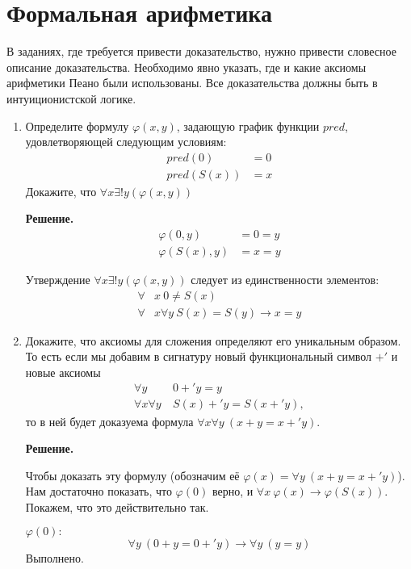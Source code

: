 \section*{Формальная арифметика}

В заданиях, где требуется привести доказательство, нужно привести словесное описание доказательства.
Необходимо явно указать, где и какие аксиомы арифметики Пеано были использованы.
Все доказательства должны быть в интуиционистской логике.
\begin{enumerate}
	
\item Определите формулу $\varphi(x,y)$, задающую график функции $pred$, удовлетворяющей следующим условиям:
\begin{align*}
pred(0) & = 0 \\
pred(S(x)) & = x
\end{align*}
Докажите, что $\forall x \exists! y (\varphi(x,y))$

\textbf{Решение.}
\begin{align*}
	\varphi(0, y) &= 0 = y \\
	\varphi(S(x), y) &= x = y
\end{align*}

Утверждение $\forall x \exists! y (\varphi(x,y))$ следует из единственности элементов:
\begin{align*}
	\forall &x \ 0 \neq S(x)\\
	\forall &x \forall y \ S(x) = S(y) \to x = y
\end{align*}

\item Докажите, что аксиомы для сложения определяют его уникальным образом.
    То есть если мы добавим в сигнатуру новый функциональный символ $+'$ и новые аксиомы
\begin{align*}
\forall y\ & 0 +' y = y \tag{$+'0$} \\
\forall x \forall y\ & S(x) +' y = S(x +' y) \tag{$+'S$},
\end{align*}
то в ней будет доказуема формула $\forall x \forall y\ (x + y = x +' y)$.

\textbf{Решение.} 

Чтобы доказать эту формулу (обозначим её $\varphi(x) = \forall y\ (x + y = x +' y)$). Нам достаточно показать, что $\varphi(0)$ верно, и $\forall x \ \varphi(x) \to \varphi(S(x))$. Покажем, что это действительно так.

$\varphi(0):$ 
\begin{equation*}
	\forall y \ (0 + y = 0 +' y) \to \forall y \ (y = y)
\end{equation*}
Выполнено.


\end{enumerate}
